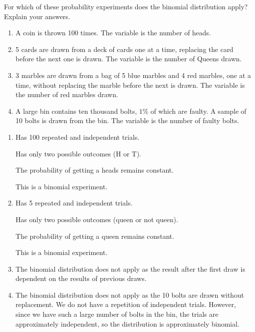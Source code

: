 \documentclass[11pt,a4paper]{book}
\begin{document}
\begin{example}

For which of these probability experiments does the binomial distribution apply? Explain your answers.

\begin{enumerate}[label=(\alph*)] 

\item A coin is thrown 100 times. The variable is the number of heads.

\item 5 cards are drawn from a deck of cards one at a time, replacing
the card before the next one is drawn. The variable is the number
of Queens drawn.

\item 3 marbles are drawn from a bag of 5 blue marbles and 4 red
marbles, one at a time, without replacing the marble before the next
is drawn. The variable is the number of red marbles drawn.

\item A large bin contains ten thousand bolts, $1\%$ of which are faulty. A sample of 10 bolts is drawn from the bin. The variable is the number of faulty bolts.

\end{enumerate} 

\Solution

\begin{enumerate}[label=(\alph*)] 

\item  Has 100 repeated and independent trials. \checkmark

Has only two possible outcomes (H or T). \checkmark

The probability of getting a heads remains constant. \checkmark

This is a binomial experiment.

\item  Has 5 repeated and independent trials. \checkmark

Has only two possible outcomes (queen or not queen). \checkmark

The probability of getting a queen remains constant. \checkmark

This is a binomial experiment.

\item  The binomial distribution does not apply as the result after
the first draw is dependent on the results of previous draws.

\item  The binomial distribution does not apply as the 10 bolts are
drawn without replacement. We do not have a repetition of independent
trials. However, since we have such a large number of bolts in the bin, the trials are approximately independent, so the distribution is approximately binomial.

\end{enumerate} 

\end{example}
\end{document}

